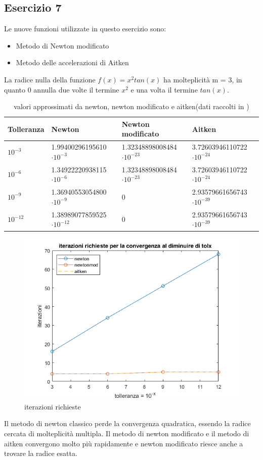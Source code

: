 \subsection{Esercizio 7}
Le nuove funzioni utilizzate in  questo esercizio sono:
\begin{itemize}
    \item Metodo di Newton modificato
    
    \item Metodo delle accelerazioni di Aitken
    
\end{itemize}
La radice nulla della funzione $f(x)=x^2tan(x)$ ha molteplicità m = 3, in quanto $0$ annulla due volte il termine
$x^2$ e una volta il termine $tan(x)$. 


\begin{table}[h]
    \renewcommand\arraystretch{2}
    \begin{tabular}{|l l l l|}
            \hline
            Tolleranza &  Newton & Newton modificato & Aitken  \\
            \hline
            $10^{-3}$  &1.99400296195610$\cdot10^{-3}$ &1.32348898008484$\cdot10^{-23}$ & 3.72603946110722$\cdot10^{-24}$  \\
            $10^{-6}$  & 1.34922220938115$\cdot10^{-6}$ &1.32348898008484$\cdot10^{-23}$& 3.72603946110722$\cdot10^{-24}$ \\
            $10^{-9}$ &1.36940553054800$\cdot10^{-9}$&           0       & 2.93579661656743$\cdot10^{-39}$ \\
            $10^{-12}$ & 1.38989077859525$\cdot10^{-12}$ &       0             &2.93579661656743$\cdot10^{-39}$\\
            \hline
    \end{tabular}
    \caption{valori approssimati da newton, newton modificato e aitken(dati raccolti in )}
    \label{tab:7}     
    \end{table}
\newpage    
\begin{figure}[h]
\includegraphics[scale=0.7]{capitolo2/iter2.png}
\caption{iterazioni richieste}
\label{fig:es7}
\end{figure}
Il metodo di newton classico perde la convergenza quadratica, essendo la radice cercata di molteplicità multipla. Il metodo di newton modificato e il metodo di aitken convergono
molto più rapidamente e newton modificato riesce anche a trovare la radice esatta.